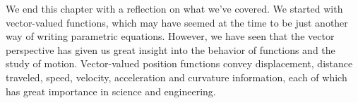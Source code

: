 
We end this chapter with a reflection on what we've covered. We started with vector-valued functions, which may have seemed at the time to be just another way of writing parametric equations. However, we have seen that the vector perspective has given us great insight into the behavior of functions and the study of motion. Vector-valued position functions convey displacement, distance traveled, speed, velocity, acceleration and curvature information, each of which has great importance in science and engineering.

